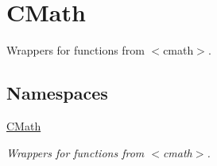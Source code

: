 \hypertarget{group__CMathGroup}{\section{C\-Math}
\label{group__CMathGroup}
}


Wrappers for functions from $<$cmath$>$.  


\subsection*{Namespaces}
\begin{DoxyCompactItemize}
\item 
\hyperlink{namespaceCMath}{C\-Math}
\begin{DoxyCompactList}\small\item\em Wrappers for functions from $<$cmath$>$. \end{DoxyCompactList}\end{DoxyCompactItemize}
